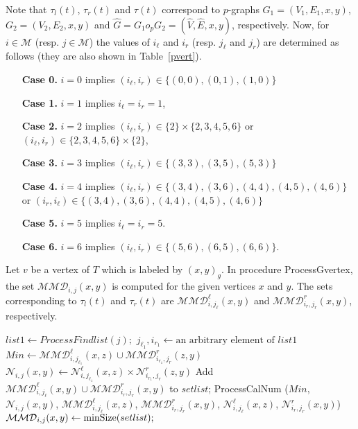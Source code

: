 \documentclass[12pt]{article}
\theoremstyle{definition}
\theoremstyle{remark}
\begin{document}
 Note that $\tau_l(t)$, $\tau_r(t)$ and $\tau(t)$   correspond  to $p$-graphs $G_1=(V_1,E_1,x,y)$, $G_2=(V_2,E_2,x,y)$ and $\hat{G}=G_1 o_pG_2=(\hat{V},\hat{E},x,y)$, respectively.
   Now, for $i\in \mathcal{M}$ (resp. $j\in \mathcal{M}$) the values of $i_\ell$ and $i_r$ (resp. $j_\ell$ and $j_r$)  are determined  as follows (they are also shown in Table~\ref{pvert}).

 \begin{itemize}
 \item[\textbf{Case 0.}]
$i=0$ implies  $(i_{\ell},i_r)\in \{(0,0),(0,1),(1,0)\}$
  \item[\textbf{Case 1.}]
 $i=1$ implies $i_{\ell}=i_r=1$,
\item[\textbf{Case 2.}]
$i=2$ implies  $(i_{\ell},i_r)\in \{2\}\times\{2,3,4,5,6\}$  or $(i_{\ell},i_r)\in \{2,3,4,5,6\}\times \{2\}$,
\item[\textbf{Case 3.}]
$i=3$ implies  $(i_{\ell},i_r)\in \{(3,3),(3,5),(5,3)\}$

\item[\textbf{Case 4.}]
$i=4$ implies  $(i_{\ell},i_r)\in \{(3,4), (3,6),(4,4),(4,5),(4,6)\}$ or $(i_r,i_\ell)\in \{(3,4), (3,6),(4,4),(4,5),(4,6)\}$ 

\item[\textbf{Case 5.}]
$i=5$ implies  $i_{\ell}=i_r=5$.

\item[\textbf{Case 6.}]
$i=6$ implies    $(i_{\ell},i_r)\in \{(5,6),(6,5),(6,6)\}$.
 \end{itemize}
 

Let $v$ be a vertex of $T$ which is labeled by $(x,y)_g$. In  procedure ProcessGvertex,
the set $\mathcal{MMD}_{i,j}(x,y)$ is computed for the given vertices $x$ and $y$. 
The sets corresponding to  $\tau_l(t)$ and $\tau_r(t)$ are $\mathcal{MMD}_{i,j_\ell}^\ell(x,y)$ and $\mathcal{MMD}_{i_r,j_r}^r(x,y)$, respectively.

\begin{algorithm}[h!]
	\begin{algorithmic}[1]
		\State $list1\gets  ProcessFindlist(j);$
					\State $j_{\ell_1},i_{r_1} \gets \text{an arbitrary element of } list1$
			\State $Min \gets \mathcal{MMD}_{i,j_{\ell_1}}^\ell(x,z)\cup \mathcal{MMD}_{i_{r_1},j_r}^r(z,y)$
						\State $\mathcal{N}_{i,j}(x,y) \gets \mathcal{N}_{i,j_{\ell_1}}^\ell(x,z)\times \mathcal{N}_{i_{r_1},j_r}^r(z,y)$
		\State Add $\mathcal{MMD}_{i,j_\ell}^\ell(x,y)\cup \mathcal{MMD}_{i_r,j_r}^r(x,y)$ to $setlist$;
		\State ProcessCalNum ($Min$, $\mathcal{N}_{i,j}(x,y)$, $\mathcal{MMD}_{i,j_\ell}^\ell(x,z)$, $ \mathcal{MMD}_{i_r,j_r}^r(x,y)$,  $\mathcal{N}_{i,j_\ell}^\ell(x,z)$, $ \mathcal{N}_{i_r,j_r}^r(x,y)$)
		\EndFor
				\State $\mathcal{MMD}_{i,j}(x,y)\gets \mbox{minSize}(setlist);$
		\EndFor
		\EndProcedure
	\end{algorithmic}
\end{algorithm}
             
\end{document}
